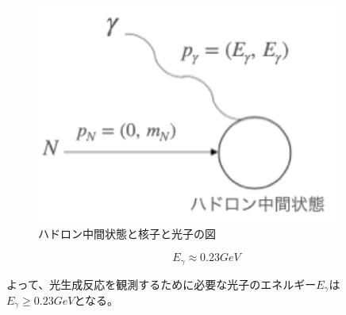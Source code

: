 \begin{figure}[H]
	\centering
	\includegraphics[width=10cm]{img/diagram_momentum.png}
	\caption{ハドロン中間状態と核子と光子の図}
	\label{fig:test2}
\end{figure}

\begin{equation}
    E_\gamma \approx 0.23 GeV
\end{equation}

よって、光生成反応を観測するために必要な光子のエネルギー$E_\gamma$は
$E_\gamma \geq 0.23 GeV$となる。